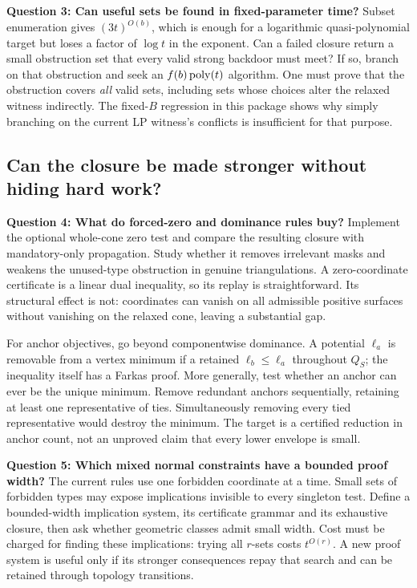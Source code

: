 \textbf{Question 3: Can useful sets be found in fixed-parameter time?}
Subset enumeration gives $(3t)^{O(b)}$, which is enough for a logarithmic quasi-polynomial target but loses a factor of $\log t$ in the exponent. Can a failed closure return a small obstruction set that every valid strong backdoor must meet? If so, branch on that obstruction and seek an $f(b)\operatorname{poly}(t)$ algorithm. One must prove that the obstruction covers \emph{all} valid sets, including sets whose choices alter the relaxed witness indirectly. The fixed-$B$ regression in this package shows why simply branching on the current LP witness's conflicts is insufficient for that purpose.

\subsection{Can the closure be made stronger without hiding hard work?}

\textbf{Question 4: What do forced-zero and dominance rules buy?}
Implement the optional whole-cone zero test and compare the resulting closure with mandatory-only propagation. Study whether it removes irrelevant masks and weakens the unused-type obstruction in genuine triangulations. A zero-coordinate certificate is a linear dual inequality, so its replay is straightforward. Its structural effect is not: coordinates can vanish on all admissible positive surfaces without vanishing on the relaxed cone, leaving a substantial gap.

For anchor objectives, go beyond componentwise dominance. A potential $\ell_a$ is removable from a vertex minimum if a retained $\ell_b\le\ell_a$ throughout $Q_S$; the inequality itself has a Farkas proof. More generally, test whether an anchor can ever be the unique minimum. Remove redundant anchors sequentially, retaining at least one representative of ties. Simultaneously removing every tied representative would destroy the minimum. The target is a certified reduction in anchor count, not an unproved claim that every lower envelope is small.

\textbf{Question 5: Which mixed normal constraints have a bounded proof width?}
The current rules use one forbidden coordinate at a time. Small sets of forbidden types may expose implications invisible to every singleton test. Define a bounded-width implication system, its certificate grammar and its exhaustive closure, then ask whether geometric classes admit small width. Cost must be charged for finding these implications: trying all $r$-sets costs $t^{O(r)}$. A new proof system is useful only if its stronger consequences repay that search and can be retained through topology transitions.

